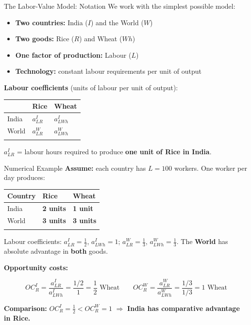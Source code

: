 \documentclass[
  ignorenonframetext,
  aspectratio=169,
]{beamer}
\makeatletter
\providecommand{\tightlist}{%
  \setlength{\itemsep}{0pt}\setlength{\parskip}{0pt}}
\let\quarto@originallabel\label
\DeclareRobustCommand*{\label}[1]{\quarto@originallabel{#1}}
\makeatother
\begin{document}
\begin{frame}{The Labor-Value Model: Notation}
\label{the-labor-value-model-notation}
We work with the simplest possible model:

\begin{itemize}
\tightlist
\item
  \textbf{Two countries:} India (\(I\)) and the World (\(W\))
\item
  \textbf{Two goods:} Rice (\(R\)) and Wheat (\(Wh\))
\item
  \textbf{One factor of production:} Labour (\(L\))
\item
  \textbf{Technology:} constant labour requirements per unit of output
\end{itemize}

\textbf{Labour coefficients} (units of labour per unit of output):

\begin{longtable}[]{@{}lll@{}}
\toprule\noalign{}
& Rice & Wheat \\
\midrule\noalign{}
\endhead
India & \(a_{LR}^{I}\) & \(a_{LWh}^{I}\) \\
World & \(a_{LR}^{W}\) & \(a_{LWh}^{W}\) \\
\bottomrule\noalign{}
\end{longtable}

\(a_{LR}^{I}\) = labour hours required to produce \textbf{one unit of
Rice in India}.
\end{frame}

\begin{frame}{Numerical Example}
\label{numerical-example}
\textbf{Assume:} each country has \(L = 100\) workers. One worker per
day produces:

\begin{longtable}[]{@{}lll@{}}
\toprule\noalign{}
Country & Rice & Wheat \\
\midrule\noalign{}
\endhead
India & \textbf{2 units} & \textbf{1 unit} \\
World & \textbf{3 units} & \textbf{3 units} \\
\bottomrule\noalign{}
\end{longtable}

Labour coefficients: \(a_{LR}^{I} = \tfrac{1}{2}\), \(a_{LWh}^{I} = 1\);
\(a_{LR}^{W} = \tfrac{1}{3}\), \(a_{LWh}^{W} = \tfrac{1}{3}\). The
\textbf{World} has absolute advantage in \textbf{both} goods.

\textbf{Opportunity costs:}

\[OC_R^{I} = \frac{a_{LR}^{I}}{a_{LWh}^{I}} = \frac{1/2}{1} = \frac{1}{2} \text{ Wheat} \qquad OC_R^{W} = \frac{a_{LR}^{W}}{a_{LWh}^{W}} = \frac{1/3}{1/3} = 1 \text{ Wheat}\]

\textbf{Comparison:} \(OC_R^{I} = \tfrac{1}{2} < OC_R^{W} = 1\)
\(\Rightarrow\) \textbf{India has comparative advantage in Rice.}
\end{frame}
\end{document}
